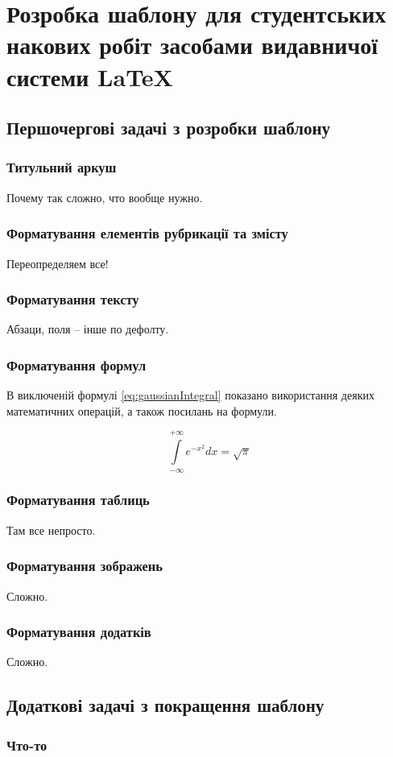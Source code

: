 \chapter{Розробка шаблону для студентських накових робіт засобами видавничої системи \LaTeX{}} 
\label{chap:second}

\section{Першочергові задачі з розробки шаблону}

\subsection{Титульний аркуш}

Почему так сложно, что вообще нужно.

\subsection{Форматування елементів рубрикації та змісту}
\label{dev:toc}

Переопределяем все!

\subsection{Форматування тексту}
Абзаци, поля -- інше по дефолту.

\subsection{Форматування формул}
В виключеній формулі \ref{eq:gaussianIntegral} показано використання деяких математичних операцій, а також посилань на формули.

\begin{equation}
\label{eq:gaussianIntegral}
\int\limits^{+\infty}_{-\infty} e^{-x^2} dx = \sqrt{\pi} 
\end{equation}

\subsection{Форматування таблиць}
Там все непросто.

\subsection{Форматування зображень}

Сложно.

\subsection{Форматування додатків}

Сложно.

\section{Додаткові задачі з покращення шаблону}

\subsection{Что-то}

